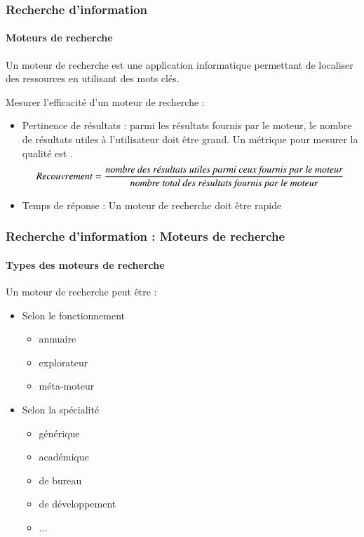 \documentclass[xcolor=table]{beamer}
\begin{document}
\begin{frame}
\frametitle{Recherche d'information}
\framesubtitle{Moteurs de recherche}

\begin{definition}
	Un moteur de recherche est une application informatique permettant de localiser des ressources en utilisant des mots clés.
\end{definition}

Mesurer l'efficacité d'un moteur de recherche :
\begin{itemize}
	\item Pertinence de résultats : parmi les résultats fournis par le moteur, le nombre de résultats utiles à l'utilisateur doit être grand. Un métrique pour mesurer la qualité est .
	{\scriptsize \[ Recouvrement = \frac{\text{\itshape nombre des résultats utiles parmi ceux fournis par le moteur}}{\text{\itshape nombre total des résultats fournis par le moteur}} \]}
	\item Temps de réponse : Un moteur de recherche doit être rapide
\end{itemize}

\end{frame}

\begin{frame}
\frametitle{Recherche d'information : Moteurs de recherche}
\framesubtitle{Types des moteurs de recherche}

Un moteur de recherche peut être :
\begin{itemize}
	\item Selon le fonctionnement
	\begin{itemize}
		\item annuaire
		\item explorateur
		\item méta-moteur
	\end{itemize}

	\item Selon la spécialité
	\begin{itemize}
		\item générique
		\item académique
		\item de bureau 
		\item de développement
		\item ...
	\end{itemize}
\end{itemize} 

\end{frame}
\end{document}
